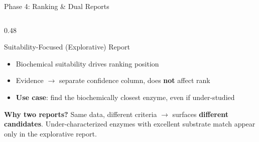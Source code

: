 \documentclass[aspectratio=169, 11pt]{beamer}
\begin{document}
\begin{frame}{Phase 4: Ranking \& Dual Reports}
\begin{columns}[T]
\begin{column}{0.48\textwidth}
\vspace{2pt}
\begin{alertblock}{\small Suitability-Focused (Explorative) Report}
\vspace{-2pt}
\begin{itemize}\scriptsize
\setlength\itemsep{1pt}
\item Biochemical suitability drives ranking position
\item Evidence $\rightarrow$ separate confidence column, does \textbf{not} affect rank
\item \textbf{Use case}: find the biochemically closest enzyme, even if under-studied
\end{itemize}
\end{alertblock}

\vspace{2pt}
\colorbox{accentgreen!15}{\parbox{0.92\textwidth}{\centering
\scriptsize\textbf{Why two reports?} Same data, different criteria $\rightarrow$ surfaces \textbf{different candidates}. Under-characterized enzymes with excellent substrate match appear only in the explorative report.
}}

\end{column}
\end{columns}
\end{frame}
\end{document}
